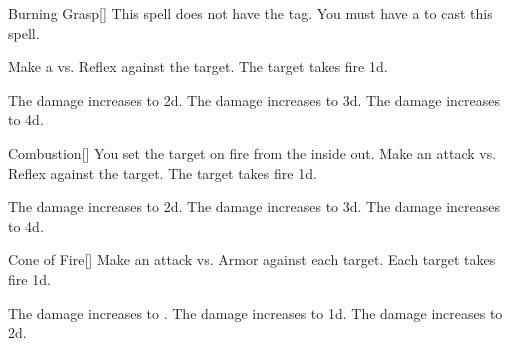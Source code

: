 \lowercase{\hypertarget{spell:Burning Grasp}{}}\label{spell:Burning Grasp}
\begin{freeability}[Rank 1]{\hypertarget{spell:Burning Grasp}{Burning Grasp}}[]
This spell does not have the  tag.
You must have a  to cast this spell.

Make a  vs. Reflex against the target.
\hit The target takes fire  \plus1d.

\rankline
{} The damage increases to  \plus2d.
 The damage increases to  \plus3d.
 The damage increases to  \plus4d.
\end{freeability}
\vspace{0.25em}



\lowercase{\hypertarget{spell:Combustion}{}}\label{spell:Combustion}
\begin{freeability}[Rank 1]{\hypertarget{spell:Combustion}{Combustion}}[]
You set the target on fire from the inside out.
Make an attack vs. Reflex against the target.
\hit The target takes fire  \plus1d.

\rankline
{} The damage increases to  \plus2d.
 The damage increases to  \plus3d.
 The damage increases to  \plus4d.
\end{freeability}
\vspace{0.25em}



\lowercase{\hypertarget{spell:Cone of Fire}{}}\label{spell:Cone of Fire}
\begin{freeability}[Rank 1]{\hypertarget{spell:Cone of Fire}{Cone of Fire}}[]
Make an attack vs. Armor against each target.
\hit Each target takes fire  \minus1d.

\rankline
{} The damage increases to .
 The damage increases to  \plus1d.
 The damage increases to  \plus2d.
\end{freeability}
\vspace{0.25em}



